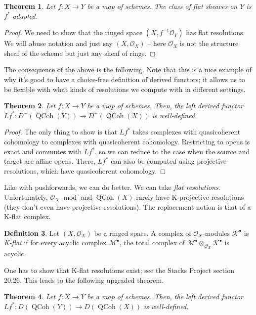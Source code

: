 \documentclass[10pt]{article}
\newtheorem{thm}{Theorem}[section]
\theoremstyle{definition}
\newtheorem{defn}[thm]{Definition}
\DeclareMathOperator{\dmod}{-mod}
\DeclareMathOperator{\QCoh}{QCoh}
\newcommand{\OO}{\mathcal{O}}
\begin{document}
\begin{thm}
Let $f: X \rightarrow Y$ be a map of schemes.  The class of flat sheaves on $Y$ is $f^*$-adapted.
\end{thm}
\begin{proof}
We need to show that the ringed space $(X, f^{-1}\OO_Y)$ has flat resolutions.  We will abuse notation and just say $(X, \OO_X)$ -- here $\OO_X$ is not the structure sheaf of the scheme but just any sheaf of rings.
\end{proof}

The consequence of the above is the following.  Note that this is a nice example of why it's good to have a choice-free definition of derived functors; it allows us to be flexible with what kinds of resolutions we compute with in different settings.
\begin{thm}
Let $f: X \rightarrow Y$ be a map of schemes.  Then, the left derived functor $Lf^*: D^-(\QCoh(Y)) \rightarrow D^-(\QCoh(X))$ is well-defined.
\end{thm}
\begin{proof}
The only thing to show is that $Lf^*$ takes complexes with quasicoherent cohomology to complexes with quasicoherent cohomology.  Restricting to opens is exact and commutes with $Lf^*$, so we can reduce to the case when the source and target are affine opens.  There, $Lf^*$ can also be computed using projective resolutions, which have quasicoherent cohomology.
\end{proof}

Like with pushforwards, we can do better.  We can take \emph{flat resolutions}.  Unfortunately, $\OO_X\dmod$ and $\QCoh(X)$ rarely have K-projective resolutions (they don't even have projective resolutions).  The replacement notion is that of a K-flat complex.
\begin{defn}
Let $(X, \OO_X)$ be a ringed space.  A complex of $\OO_X$-modules $\mathcal{K}^\bullet$ is \emph{K-flat} if for every acyclic complex $\mathcal{M}^\bullet$, the total complex of $\mathcal{M}^\bullet \otimes_{\OO_X} \mathcal{K}^\bullet$ is acyclic.
\end{defn}

One has to show that K-flat resolutions exist; see the Stacks Project section 20.26.  This leads to the following upgraded theorem.
\begin{thm}
Let $f: X \rightarrow Y$ be a map of schemes.  Then, the left derived functor $Lf^*: D(\QCoh(Y)) \rightarrow D(\QCoh(X))$ is well-defined.
\end{thm}
\end{document}
